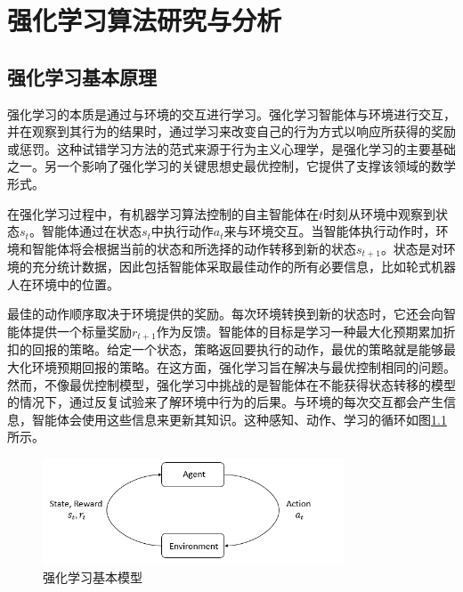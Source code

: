 ﻿\chapter{强化学习算法研究与分析}\label{rl}

\section{强化学习基本原理}
强化学习的本质是通过与环境的交互进行学习。强化学习智能体与环境进行交互，并在观察到其行为的结果时，通过学习来改变自己的行为方式以响应所获得的奖励或惩罚。这种试错学习方法的范式来源于行为主义心理学，是强化学习的主要基础之一\cite{17}。另一个影响了强化学习的关键思想史最优控制，它提供了支撑该领域的数学形式。

在强化学习过程中，有机器学习算法控制的自主智能体在$t$时刻从环境中观察到状态$s_t$。智能体通过在状态$s_t$中执行动作$a_t$来与环境交互。当智能体执行动作时，环境和智能体将会根据当前的状态和所选择的动作转移到新的状态$s_{t+1}$。状态是对环境的充分统计数据，因此包括智能体采取最佳动作的所有必要信息，比如轮式机器人在环境中的位置。

最佳的动作顺序取决于环境提供的奖励。每次环境转换到新的状态时，它还会向智能体提供一个标量奖励$r_{t+1}$作为反馈。智能体的目标是学习一种最大化预期累加折扣的回报的策略。给定一个状态，策略返回要执行的动作，最优的策略就是能够最大化环境预期回报的策略。在这方面，强化学习旨在解决与最优控制相同的问题。然而，不像最优控制模型，强化学习中挑战的是智能体在不能获得状态转移的模型的情况下，通过反复试验来了解环境中行为的后果。与环境的每次交互都会产生信息，智能体会使用这些信息来更新其知识。这种感知、动作、学习的循环如图\ref{stateaction}所示。
\begin{figure}[htb]
  \centering
  \includegraphics[width=0.80\textwidth]{figures/stateaction.png}
  \caption{强化学习基本模型}\label{stateaction}
\end{figure}

